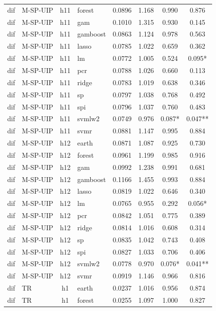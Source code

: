 \begin{ThreePartTable}
\begin{longtable}[t]{llclcccc}
dif & M-SP-UIP & h11 & forest & 0.0896 & 1.168 & 0.990 & 0.876\\
dif & M-SP-UIP & h11 & gam & 0.1010 & 1.315 & 0.930 & 0.145\\
dif & M-SP-UIP & h11 & gamboost & 0.0863 & 1.124 & 0.978 & 0.563\\
dif & M-SP-UIP & h11 & lasso & 0.0785 & 1.022 & 0.659 & 0.362\\
dif & M-SP-UIP & h11 & lm & 0.0772 & 1.005 & 0.524 & 0.095*\\
dif & M-SP-UIP & h11 & pcr & 0.0788 & 1.026 & 0.660 & 0.113\\
dif & M-SP-UIP & h11 & ridge & 0.0783 & 1.019 & 0.638 & 0.346\\
dif & M-SP-UIP & h11 & sp & 0.0797 & 1.038 & 0.768 & 0.492\\
dif & M-SP-UIP & h11 & spi & 0.0796 & 1.037 & 0.760 & 0.483\\
dif & M-SP-UIP & h11 & svmlw2 & 0.0749 & 0.976 & 0.087* & 0.047**\\
dif & M-SP-UIP & h11 & svmr & 0.0881 & 1.147 & 0.995 & 0.884\\
\addlinespace
dif & M-SP-UIP & h12 & earth & 0.0871 & 1.087 & 0.925 & 0.730\\
dif & M-SP-UIP & h12 & forest & 0.0961 & 1.199 & 0.985 & 0.916\\
dif & M-SP-UIP & h12 & gam & 0.0992 & 1.238 & 0.991 & 0.681\\
dif & M-SP-UIP & h12 & gamboost & 0.1166 & 1.455 & 0.993 & 0.884\\
dif & M-SP-UIP & h12 & lasso & 0.0819 & 1.022 & 0.646 & 0.340\\
dif & M-SP-UIP & h12 & lm & 0.0765 & 0.955 & 0.292 & 0.056*\\
dif & M-SP-UIP & h12 & pcr & 0.0842 & 1.051 & 0.775 & 0.389\\
dif & M-SP-UIP & h12 & ridge & 0.0814 & 1.016 & 0.608 & 0.314\\
dif & M-SP-UIP & h12 & sp & 0.0835 & 1.042 & 0.743 & 0.408\\
dif & M-SP-UIP & h12 & spi & 0.0827 & 1.033 & 0.706 & 0.406\\
dif & M-SP-UIP & h12 & svmlw2 & 0.0778 & 0.970 & 0.076* & 0.041**\\
dif & M-SP-UIP & h12 & svmr & 0.0919 & 1.146 & 0.966 & 0.816\\
\addlinespace
dif & TR & h1 & earth & 0.0237 & 1.016 & 0.956 & 0.874\\
dif & TR & h1 & forest & 0.0255 & 1.097 & 1.000 & 0.827\\

\end{longtable}
\end{ThreePartTable}
